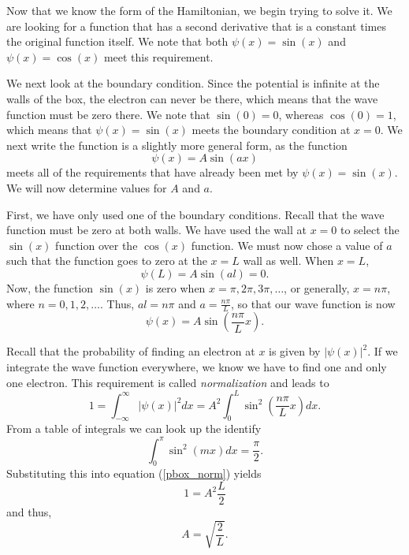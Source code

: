Now that we know the form of the Hamiltonian, we begin trying
to solve it. We are looking for a function that has a second
derivative that is a constant times the original function itself. We
note that both $\psi(x) = \sin(x)$ and $\psi(x) = \cos(x)$ meet this
requirement. 

We next look at the boundary condition. Since the potential is
infinite at the walls of the box, the electron can never be there,
which means that the wave function must be zero there. We note that
$\sin(0)=0$, whereas $\cos(0)=1$, which means that $\psi(x)=\sin(x)$
meets the boundary condition at $x=0$. We next write the function is a
slightly more general form, as the function
\begin{equation}
	\psi(x) = A\sin(ax)
\end{equation}
meets all of the requirements that have already been met by
$\psi(x)=\sin(x)$. We will now determine values for $A$ and $a$.

First, we have only used one of the boundary conditions. Recall that
the wave function must be zero at both walls. We have used the wall at
$x=0$ to select the $\sin(x)$ function over the $\cos(x)$
function. We must now chose a value of $a$ such that the function goes
to zero at the $x=L$ wall as well. When $x=L$,
\begin{equation}
	\psi(L) = A\sin(al) = 0.
\end{equation}
Now, the function $\sin(x)$ is zero when
$x=\pi,2\pi,3\pi,\dots$, or generally, $x=n\pi$, where
$n=0,1,2,\dots$. Thus, $al = n\pi$ and $a = \frac{n\pi}{L}$, so that
our wave function is now
\begin{equation}
	\psi(x) = A\sin\left(\frac{n\pi}{L}x\right).
\end{equation}

Recall that the probability of finding an electron at $x$ is given by
$|\psi(x)|^2$. If we integrate the wave function everywhere, we know
we have to find one and only one electron. This requirement is called
\emph{normalization} and leads to
\begin{equation}
	1 = \int_{-\infty}^\infty\left|\psi(x)\right|^2dx
	  = A^2\int_0^L\sin^2\left(\frac{n\pi}{L}x\right)dx.
\label{pbox_norm}
\end{equation}
From a table of integrals we can look up the identify
\begin{equation}
	\int_0^\pi\sin^2(mx)dx = \frac{\pi}{2}.
\end{equation}
Substituting this into equation (\ref{pbox_norm}) yields
\begin{equation}
	1 = A^2 \frac{L}{2}
\end{equation}
and thus,
\begin{equation}
	A = \sqrt{\frac{2}{L}}.
\end{equation}

